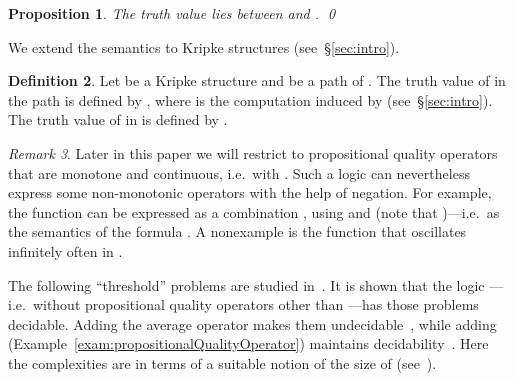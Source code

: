 \documentclass[a4paper,USenglish,numberwithinsect]{lipics}
\newif\ifignore \ignorefalse
\newcommand{\auxproof}[1]{
\ifignore\mbox{}\newline
\textbf{BEGIN: AUX-PROOF} \dotfill\newline
{#1}\mbox{}\newline
\textbf{END: AUX-PROOF}\dotfill\newline
\fi}
\theoremstyle{definition}
\newtheorem{defi}{Definition}[section]
\theoremstyle{remark}
\newtheorem{rem}[defi]{Remark}
\theoremstyle{plain}
\newtheorem{prop}[defi]{Proposition}
\begin{document}
\begin{prop}\label{lem:maxTruthValOfDiscountedUntil}
 The truth value 
 lies between  and . \qed
\end{prop}

We extend the semantics to Kripke structures (see~\S{}\ref{sec:intro}). 
\begin{defi}
 Let  be a Kripke structure and  be a path of . 
 The truth value  of  in the path  is defined by
 , where
  is the computation 
 induced by  (see~\S{}\ref{sec:intro}). 
The truth value  of  in  is defined by .
\end{defi}
\auxproof{
The choice of infimum (instead of ) in the definition of  is due to~\cite{AlmagorBK14} and is more natural, modeling
the worst case value, when we consider
the threshold model-checking problem (see
below).
}





\begin{rem} 
 Later in this paper we will restrict to propositional quality operators 
 that are monotone and
 continuous, i.e.\   with . 
 Such a logic can nevertheless express some non-monotonic 
 operators with the help of negation. For example, the function
  can be expressed as 
 a combination , using
 and 
 (note that  )---i.e.\ as the semantics of the formula
 . A nonexample is the function 
  that oscillates infinitely often in .
\end{rem}



The following ``threshold'' problems are studied
in~\cite{AlmagorBK14,AlmagorBK13ExtendedPreprint}. It is shown that the logic
---i.e.\ without propositional quality operators
other than ---has those problems decidable. Adding the
average operator  makes them undecidable~\cite{AlmagorBK14},
while adding 
(Example~\ref{exam:propositionalQualityOperator}) maintains decidability~\cite{AlmagorBK13ExtendedPreprint}.
Here the complexities are  in terms of a suitable notion
  of the size of  
 (see~\cite{AlmagorBK14}). 
\end{document}
